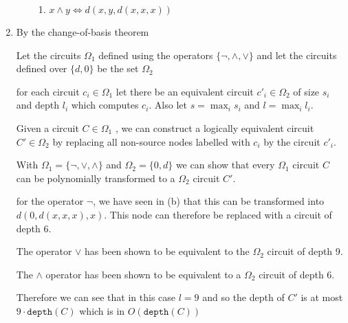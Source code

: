 \documentclass{article}
\begin{document}
\begin{enumerate}
\begin{enumerate}
\begin{enumerate}
           \item $x \wedge y \Longleftrightarrow d(x,y,d(x,x,x))$
         \end{enumerate}


        \end{enumerate}
  \item By the change-of-basis theorem

        Let the circuits $\Omega_{1}$ defined using the operators $\{ \neg , \wedge , \vee \} $ and let the circuits defined over $\{ d, 0 \} $ be the set $\Omega_{2}$

        for each circuit $c_{i} \in \Omega_{1}$ let there be an equivalent circuit $c'_{i} \in \Omega_{2}$ of size $s_{i}$ and depth $l_{i}$ which computes $c_{i}$. Also let $s = \max_{i} s_{i}$ and $l = \max_{i} l_{i}$.

        Given a circuit $C \in \Omega_{1}$ , we can construct a logically equivalent circuit $C' \in \Omega_{2}$ by replacing all non-source nodes labelled with $c_{i}$ by the circuit $c'_{i}$.

        With $\Omega_{1} = \{ \neg , \vee , \wedge\} $ and $\Omega_{2} = \{ 0, d \} $ we can show that every $\Omega_{1}$ circuit $C $ can be polynomially transformed to a $\Omega_{2}$ circuit $C'$.

        for the operator \(\neg\), we have seen in (b) that this can be transformed into $d(0,d(x,x,x),x)$. This node can therefore be replaced with a circuit of depth 6.

        The operator $\vee$ has been shown to be equivalent to the \(\Omega_{2}\) circuit of depth 9.

        The \(\wedge\) operator has been shown to be equivalent to a \(\Omega_{2}\) circuit of depth 6.

        Therefore we can see that in this case $l = 9$ and so the depth of $C'$ is at most $9 \cdot \texttt{depth} (C)$ which is in $O(\texttt{depth} (C))$


\end{enumerate}
\end{document}
